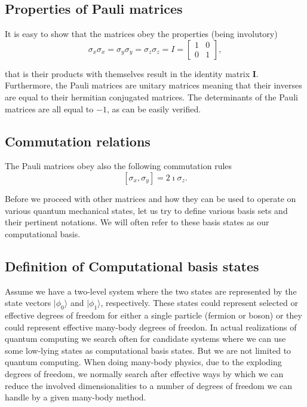 \subsection{Properties of Pauli matrices}

It is easy to show that the matrices obey the properties (being involutory)
\[
\sigma_x\sigma_x = \sigma_y\sigma_y=\sigma_z\sigma_z = I=\begin{bmatrix} 1 & 0 \\ 0 & 1\end{bmatrix},
\]

that is their products with themselves result in the identity matrix
$\bm{I}$.  Furthermore, the Pauli matrices are unitary matrices
meaning that their inverses are equal to their hermitian conjugated
matrices. The determinants of the Pauli matrices are all equal to $-1$,
as can be easily verified.

\subsection{Commutation relations}

The Pauli matrices obey also the following commutation rules
\[
\left[\sigma_x,\sigma_y\right] = 2\imath \sigma_z.
\]

Before we proceed with other matrices and how they can be used to
operate on various quantum mechanical states, let us try to define
various basis sets and their pertinent notations. We will often refer
to these basis states as our computational basis.

\subsection{Definition of Computational basis states}

Assume we have a two-level system where the two states are represented
by the state vectors $\vert \phi_0\rangle$ and $\vert \phi_1\rangle$,
respectively. These states could represent selected or effective
degrees of freedom for either a single particle (fermion or boson) or
they could represent effective many-body degrees of freedon. In actual
realizations of quantum computing we search often for candidate
systems where we can use some low-lying states as computational basis
states. But we are not limited to quantum computing. When doing
many-body physics, due to the exploding degrees of freedom, we
normally search after effective ways by which we can reduce the
involved dimensionalities to a number of degrees of freedom we can
handle by a given many-body method.

